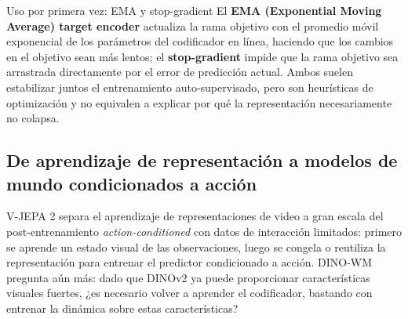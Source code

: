 

\begin{knowledgebox}{Uso por primera vez: EMA y stop-gradient}
El \textbf{EMA (Exponential Moving Average) target encoder} actualiza la rama objetivo con el promedio móvil exponencial de los parámetros del codificador en línea, haciendo que los cambios en el objetivo sean más lentos; el \textbf{stop-gradient} impide que la rama objetivo sea arrastrada directamente por el error de predicción actual. Ambos suelen estabilizar juntos el entrenamiento auto-supervisado, pero son heurísticas de optimización y no equivalen a explicar por qué la representación necesariamente no colapsa.
\end{knowledgebox}

\subsection{De aprendizaje de representación a modelos de mundo condicionados a acción}

V-JEPA 2 separa el aprendizaje de representaciones de video a gran escala del post-entrenamiento \textit{action-conditioned} con datos de interacción limitados: primero se aprende un estado visual de las observaciones, luego se congela o reutiliza la representación para entrenar el predictor condicionado a acción. DINO-WM pregunta aún más: dado que DINOv2 ya puede proporcionar características visuales fuertes, ¿es necesario volver a aprender el codificador, bastando con entrenar la dinámica sobre estas características?




